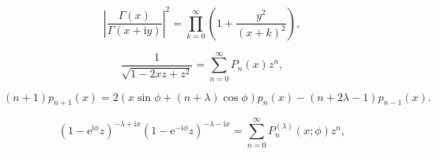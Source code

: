 
\[\left|\frac{\Gamma\left(x\right)}{\Gamma\left(x+\mathrm{i}y\right)}\right|^{2}%
=\prod_{k=0}^{\infty}\left(1+\frac{y^{2}}{(x+k)^{2}}\right),\]

\[\frac{1}{\sqrt{1-2xz+z^{2}}}=\sum_{n=0}^{\infty}P_{n}\left(x\right)z^{n},\]

\[(n+1)p_{n+1}(x)=2\left(x\sin\phi+(n+\lambda)\cos\phi\right)p_{n}(x)-(n+2%
\lambda-1)p_{n-1}(x).\]

\[(1-{\mathrm{e}}^{\mathrm{i}\phi}z)^{-\lambda+\mathrm{i}x}(1-{\mathrm{e}}^{-%
\mathrm{i}\phi}z)^{-\lambda-\mathrm{i}x}=\sum_{n=0}^{\infty}P^{(\lambda)}_{n}%
\left(x;\phi\right)z^{n},\]
